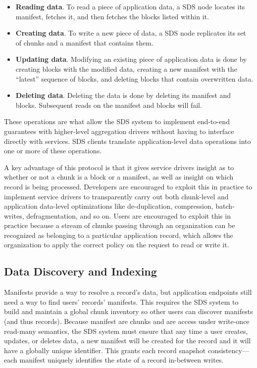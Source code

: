 \begin{itemize}
   \item \textbf{Reading data}.  To read a piece of application data, a SDS node locates
    its manifest, fetches it, and then fetches the blocks listed within it.

   \item \textbf{Creating data}.  To write a new piece of data, a SDS node replicates
    its set of chunks and a manifest that contains them.

   \item \textbf{Updating data}.  Modifying an existing
    piece of application data is done by creating blocks with the modified data,
    creating a new manifest with the ``latest'' sequence of blocks, and deleting
    blocks that contain overwritten data.

   \item \textbf{Deleting data}.  Deleting the data is done by
    deleting its manifest and blocks.  Subsequent reads on the manifest and
    blocks will fail.
\end{itemize}

These operations are what allow the SDS system to implement end-to-end
guarantees with higher-level aggregation drivers without having to interface
directly with services.  SDS clients translate application-level data
operations into one or more of these operations.

A key advantage of this protocol is that it gives service drivers insight as to whether or not a
chunk is a block or a manifest, as well as insight on which 
record is being processed.  Developers are encouraged to exploit this in practice to implement
service drivers to transparently carry out both chunk-level and application
data-level optimizations like de-duplication, compression, batch-writes,
defragmentation, and so on.  Users are encouraged to exploit this in practice
because a stream of chunks passing through an organization can be recognized as
belonging to a particular application record, which allows the organization to
apply the correct policy on the request to read or write it.

\subsection{Data Discovery and Indexing}

Manifests provide a way to resolve a record's data, but application endpoints
still need a way to find users' records' manifests.
This requires the SDS system to build and maintain a global
chunk inventory so other users can discover manifests (and thus records).
Because manifest are chunks and are access under write-once read-many semantics,
the SDS system must ensure that any time a user creates, updates, or deletes
data, a new manifest will be created for the record and it will have a globally unique
identifier.  This grants each record snapshot consistency---each manifest
uniquely identifies the state of a record in-between writes.

